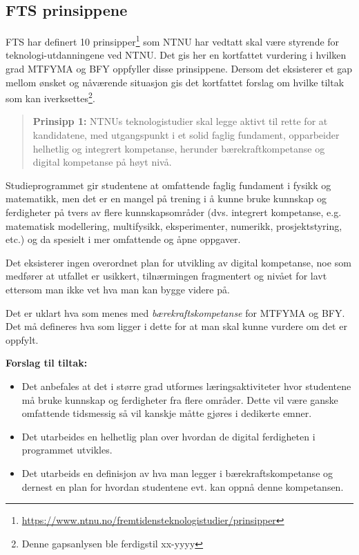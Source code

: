 \subsection{FTS prinsippene}

FTS har definert 10 prinsipper\footnote{\url{https://www.ntnu.no/fremtidensteknologistudier/prinsipper}} som NTNU har vedtatt skal være styrende for teknologi-utdanningene ved NTNU. Det gis her en kortfattet vurdering i hvilken grad MTFYMA og BFY oppfyller disse prinsippene. Dersom det eksisterer et gap mellom ønsket og nåværende situasjon gis det kortfattet forslag om hvilke tiltak som kan iverksettes\footnote{Denne gapsanlysen ble ferdigstil xx-yyyy}.

\begin{quote}
	\textbf{Prinsipp 1:} NTNUs teknologistudier skal legge aktivt til rette for at kandidatene, med utgangspunkt i et solid faglig fundament, opparbeider helhetlig og integrert kompetanse, herunder bærekraftkompetanse og digital kompetanse på høyt nivå.
\end{quote}

Studieprogrammet gir studentene at omfattende faglig fundament i fysikk og matematikk, men det er en mangel på trening i å kunne bruke kunnskap og ferdigheter på tvers av flere kunnskapsområder (dvs. integrert kompetanse, e.g. matematisk modellering, multifysikk, eksperimenter, numerikk, prosjektstyring, etc.) og da spesielt i mer omfattende og åpne oppgaver.

Det eksisterer ingen overordnet plan for utvikling av digital kompetanse, noe som medfører at utfallet er usikkert, tilnærmingen fragmentert og nivået for lavt ettersom man ikke vet hva man kan bygge videre på.

Det er uklart hva som menes med \emph{bærekraftskompetanse} for MTFYMA og BFY. Det må defineres hva som ligger i dette for at man skal kunne vurdere om det er oppfylt.

\textbf{Forslag til tiltak:}
\begin{itemize}
	\item Det anbefales at det i større grad utformes læringsaktiviteter hvor studentene må bruke kunnskap og ferdigheter fra flere områder. Dette vil være ganske omfattende tidsmessig så vil kanskje måtte gjøres i dedikerte emner.
	\item Det utarbeides en helhetlig plan over hvordan de digital ferdigheten i programmet utvikles.
	\item Det utarbeids en definisjon av hva man legger i bærekraftskompetanse og dernest en plan for hvordan studentene evt. kan oppnå denne kompetansen.
\end{itemize}

